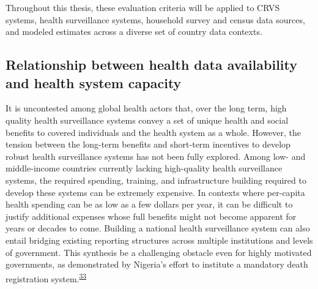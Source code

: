 \documentclass[
]{article}
\begin{document}
Throughout this thesis, these evaluation criteria will be applied to CRVS systems, health surveillance systems, household survey and census data sources, and modeled estimates across a diverse set of country data contexts.

\hypertarget{relationship-between-health-data-availability-and-health-system-capacity}{%
\subsection{Relationship between health data availability and health system capacity}\label{relationship-between-health-data-availability-and-health-system-capacity}}

It is uncontested among global health actors that, over the long term, high quality health surveillance systems convey a set of unique health and social benefits to covered individuals and the health system as a whole. However, the tension between the long-term benefits and short-term incentives to develop robust health surveillance systems has not been fully explored. Among low- and middle-income countries currently lacking high-quality health surveillance systems, the required spending, training, and infrastructure building required to develop these systems can be extremely expensive. In contexts where per-capita health spending can be as low as a few dollars per year, it can be difficult to justify additional expenses whose full benefits might not become apparent for years or decades to come. Building a national health surveillance system can also entail bridging existing reporting structures across multiple institutions and levels of government. This synthesis be a challenging obstacle even for highly motivated governments, as demonstrated by Nigeria's effort to institute a mandatory death registration system.\textsuperscript{\protect\hyperlink{ref-Makinde2020}{33}}
\end{document}
